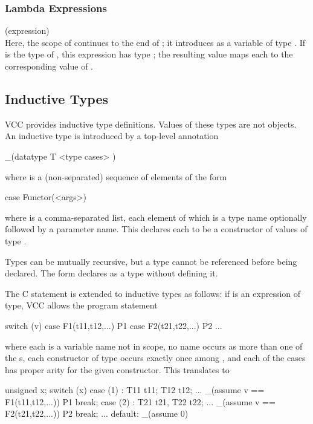 \documentclass[preprint,nocopyrightspace]{sigplanconf}
\begin{document}
{{\subsubsection{Lambda Expressions}
 (expression)\\
Here, the scope of  continues to the end of ; it
introduces  as a variable of type . If  is the
type of , this expression has type ; the resulting
value maps each  to the corresponding value of .

\subsection{Inductive Types}
VCC provides inductive type definitions. Values of these types are not
objects.  An inductive type is introduced by a top-level annotation
\begin{VCC}
  _(datatype T {
    <type cases>
  })
\end{VCC}
where  is a (non-separated) sequence of elements of the form
\begin{VCC}
  case Functor(<args>)
\end{VCC}
where  is a comma-separated list, each element of which is
a type name optionally followed by a parameter name. This
declares each  to be a constructor of values of
type . 

Types can be mutually recursive, but a type cannot be referenced
before being declared. The form  declares  as a
type without defining it.

The C  statement is extended to inductive types as
follows: if  is an expression of type, VCC allows the program statement 
\begin{VCC}
switch (v) {
  case F1(t11,t12,...) { P1 }
  case F2(t21,t22,...) { P2 }
  ...
}
\end{VCC}
where each  is a variable name not in scope, no name occurs
as more than one of the s, each constructor of type 
occurs exactly once among , and each of the cases has
proper arity for the given constructor. 
This translates to 
\begin{VCC}
{
  unsigned x;
  switch (x) {
    case (1) : {
      T11 t11; T12 t12; ...
      _(assume v == F1(t11,t12,...))
      { P1 }
      break;
    } case (2) : {
      T21 t21, T22 t22; ...
      _(assume v == F2(t21,t22,...))
      { P2 }
      break;
    } ...
    default: _(assume 0)
  }
}
\end{VCC}

}}
\end{document}
